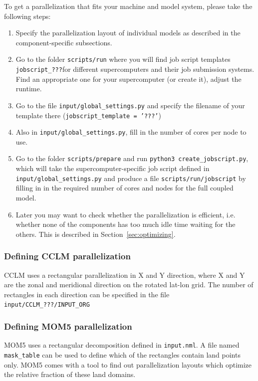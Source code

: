\documentclass[a4paper,titlepage]{scrartcl}
\begin{document}
To get a parallelization that fits your machine and model system, please take the following steps:
\begin{sloppypar}
\begin{enumerate}
\item Specify the parallelization layout of individual models as described in the component-specific subsections.
\item Go to the folder \texttt{scripts/run} where you will find job script templates \texttt{jobscript\_\color{red}???\color{black}}{}for different supercomputers and their job submission systems. Find an appropriate one for your supercomputer (or create it), adjust the runtime.
\item Go to the file \texttt{input/global\_settings.py} and specify the filename of your template there (\texttt{jobscript\_template = '\color{red}???\color{black}'})
\item Also in \texttt{input/global\_settings.py}, fill in the number of cores per node to use.
\item Go to the folder \texttt{scripts/prepare} and run \texttt{python3 create\_jobscript.py}, which will take the supercomputer-specific job script defined in \texttt{input/global\_settings.py} and produce a file \texttt{scripts/run/jobscript} by filling in in the required number of cores and nodes for the full coupled model.
\item Later you may want to check whether the parallelization is efficient, i.e. whether none of the components has too much idle time waiting for the others. This is described in Section~\ref{sec:optimizing}.
\end{enumerate}
\end{sloppypar}

\subsubsection{Defining CCLM parallelization}
CCLM uses a rectangular parallelization in X and Y direction, where X and Y are the zonal and meridional direction on the rotated lat-lon grid. The number of rectangles in each direction can be specified in the file \texttt{input/CCLM\_\color{red}???\color{black}/INPUT\_ORG} 

\subsubsection{Defining MOM5 parallelization}
MOM5 uses a rectangular decomposition defined in \texttt{input.nml}. 
A file named \texttt{mask\_table} can be used to define which of the rectangles contain land points only.
MOM5 comes with a tool to find out parallelization layouts which optimize the relative fraction of these land domains.
\end{document}
